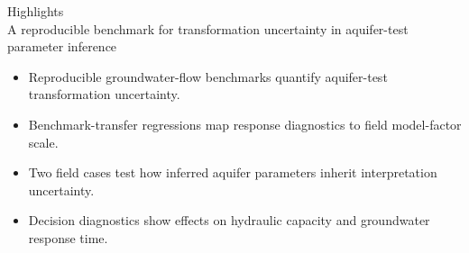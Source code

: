 \documentclass[11pt]{article}
\begin{document}
\begin{center}
{\Large Highlights}\\[1em]
{\large A reproducible benchmark for transformation uncertainty in aquifer-test parameter inference}
\end{center}

\onehalfspacing
\begin{itemize}
\item Reproducible groundwater-flow benchmarks quantify aquifer-test transformation uncertainty.
\item Benchmark-transfer regressions map response diagnostics to field model-factor scale.
\item Two field cases test how inferred aquifer parameters inherit interpretation uncertainty.
\item Decision diagnostics show effects on hydraulic capacity and groundwater response time.
\end{itemize}
\end{document}
